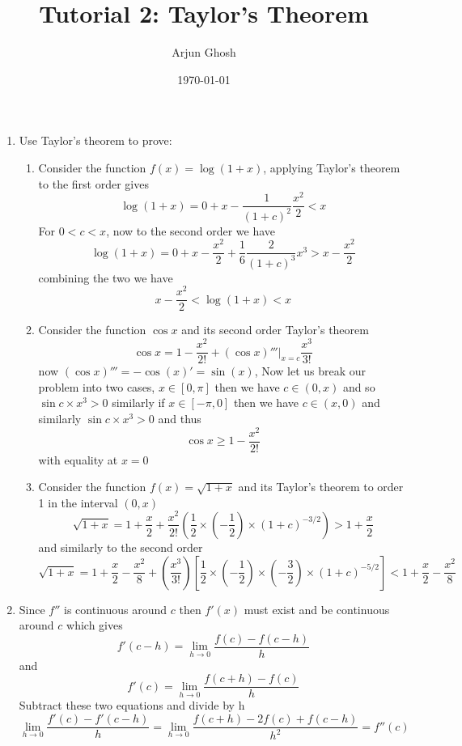 \documentclass[12pt]{article}
\title{Tutorial 2: Taylor's Theorem}
\author{Arjun Ghosh}
\date{\today}
\begin{document}
\maketitle

\begin{enumerate}
	\item
		Use Taylor's theorem to prove:
		\begin{enumerate}
			\item
				Consider the function $f(x)= \log(1+x)$, applying Taylor's theorem to the first order gives
				$$
				\log(1+x) = 0 + x   -\frac{1}{(1+c)^{2}} \frac{x^{2}}{2} <x
				$$
				For $0<c<x$, now to the second order we have
				$$
				\log(1 +x) = 0 + x - \frac{x^{2}}{2} + \frac{1}{6} \frac{2}{(1+c)^{3}} x^{3} > x -\frac{x^{2}}{2}
				$$
				combining the two we have
				$$
				x - \frac{x^{2}}{2} < \log(1+x)<x
				$$
			\item
				Consider the function $\cos x$ and its second order Taylor's theorem
				$$
				\cos x = 1-\frac{x^{2}}{2!} + (\cos x)'''|_{x=c}\frac{x^{3}}{3!}
				$$
				now $(\cos x)''' = -\cos(x)' = \sin(x)$, Now let us break our problem into two cases, $x \in[0,\pi]$ then we have $c \in(0,x)$ and so $\sin c \times x^{3}>0$ similarly if $x \in[-\pi,0]$ then we have $c \in(x,0)$ and similarly $\sin c \times x^{3}>0$ and thus 
				$$
				\cos x \geq 1-\frac{x^{2}}{2!}
				$$
				with equality at $x=0$

			\item
				Consider the function $f(x) = \sqrt{ 1+x }$ and its Taylor's theorem to order 1 in the interval $(0,x)$ 
				$$
				\sqrt{ 1+x } = 1 + \frac{x}{2} + \frac{x^{2}}{2!} \left( \frac{1}{2}\times\left( -\frac{1}{2} \right)\times (1+c)^{-3/2} \right) > 1 + \frac{x}{2}
				$$
				and similarly to the second order
				$$
				\sqrt{ 1 + x } = 1 + \frac{x}{2} -\frac{x^{2}}{8} + \left( \frac{x^{3}}{3!} \right)\left[ \frac{1}{2}\times\left( -\frac{1}{2} \right)\times\left( -\frac{3}{2} \right)\times(1+c)^{-5/2} \right] < 1+\frac{x}{2}-\frac{x^{2}}{8}
				$$
		\end{enumerate}

	\item
		Since $f''$ is continuous around $c$ then $f'(x)$ must exist and be continuous around $c$ which gives
		$$
		f'(c-h) = \lim_{ h \to 0 } \frac{f(c)-f(c-h)}{h}
		$$
		and
		$$
		f'(c) = \lim_{ h \to 0 } \frac{f(c+h)-f(c)}{h}
		$$
		Subtract these two equations and divide by h
		$$
		\lim_{ h \to 0 } \frac{f'(c) -f'(c-h)}{h} = \lim_{ h \to 0 }\frac{ f(c + h)-2f(c) + f(c-h)}{h^{2}} = f''(c)
		$$


\end{enumerate}
\end{document}
